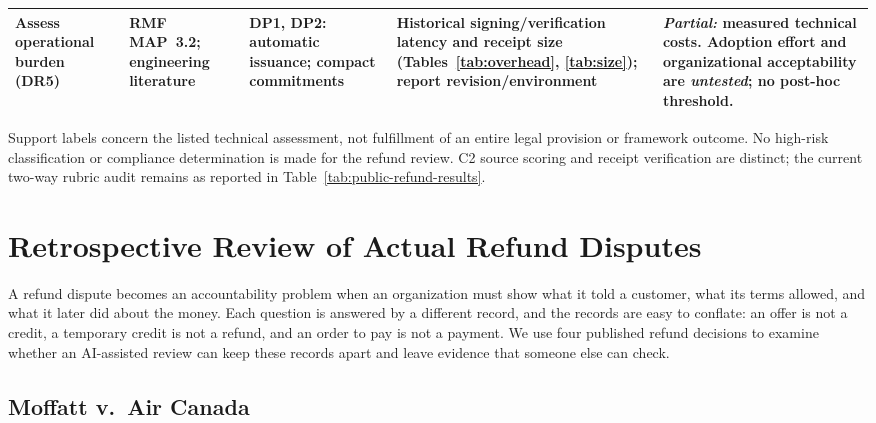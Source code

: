 \documentclass[11pt]{article}
\begin{document}
\begin{table}[!htbp]
\begin{tabularx}{\textwidth}{@{}>{\raggedright\arraybackslash}p{23mm}>{\raggedright\arraybackslash}p{28mm}>{\raggedright\arraybackslash}p{28mm}>{\raggedright\arraybackslash}X>{\raggedright\arraybackslash}X@{}}
Assess operational burden (DR5) & RMF MAP~3.2; engineering literature \citep{sculley2015,amershi2019} & DP1, DP2: automatic issuance; compact commitments & Historical signing/verification latency and receipt size (Tables~\ref{tab:overhead}, \ref{tab:size}); report revision/environment & \emph{Partial:} measured technical costs. Adoption effort and organizational acceptability are \emph{untested}; no post-hoc threshold. \\
\bottomrule
\end{tabularx}
\begin{minipage}{\textwidth}\footnotesize{}\smallskip
Support labels concern the listed technical assessment, not fulfillment of an entire legal provision or framework outcome. No high-risk classification or compliance determination is made for the refund review. C2 source scoring and receipt verification are distinct; the current two-way rubric audit remains as reported in Table~\ref{tab:public-refund-results}.
\end{minipage}
\end{table}
\FloatBarrier

\clearpage
\section{Retrospective Review of Actual Refund Disputes}\label{sec:refund-case}

A refund dispute becomes an accountability problem when an organization must show what it told a customer, what its terms allowed, and what it later did about the money. Each question is answered by a different record, and the records are easy to conflate: an offer is not a credit, a temporary credit is not a refund, and an order to pay is not a payment. We use four published refund decisions to examine whether an AI-assisted review can keep these records apart and leave evidence that someone else can check.

\subsection{Moffatt v.\ Air Canada}
\end{document}
